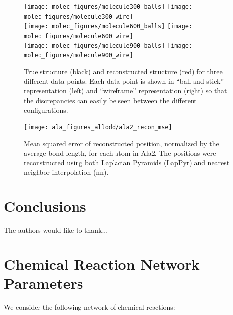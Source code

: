 \documentclass[aip,jcp,reprint,twocolumn]{revtex4-1}
\begin{document}
\begin{figure}[ht]
    \centering
    \texttt{[image: molec\_figures/molecule300\_balls]}
    \texttt{[image: molec\_figures/molecule300\_wire]}\\
    \texttt{[image: molec\_figures/molecule600\_balls]}
    \texttt{[image: molec\_figures/molecule600\_wire]}\\
    \texttt{[image: molec\_figures/molecule900\_balls]}
    \texttt{[image: molec\_figures/molecule900\_wire]}
    \caption{True structure (black) and reconstructed structure (red) for three different data points. Each data point is shown in ``ball-and-stick'' representation (left) and ``wireframe'' representation (right) so that the discrepancies can easily be seen between the different configurations.}
    \label{fig:ala_molecules}
\end{figure}

\begin{figure}
    \texttt{[image: ala\_figures\_allodd/ala2\_recon\_mse]}
    \caption{Mean squared error of reconstructed position, normalized by the average bond length, for each atom in Ala2.
    The positions were reconstructed using both Laplacian Pyramids (LapPyr) and nearest neighbor interpolation (nn).}
    \label{fig:ala_mse}
\end{figure}

\section{Conclusions} \label{sec:conclusions}

\begin{acknowledgments}
The authors would like to thank...
\end{acknowledgments}



\appendix

\section{Chemical Reaction Network Parameters} \label{app:rxn}

We consider the following network of chemical reactions:
\begin{center}
\\
\\
\\
\\
\end{center}
\end{document}
